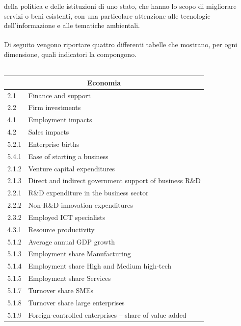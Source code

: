 \documentclass[a4paper,12pt, openright]{report}
\begin{document}
della politica e delle istituzioni di uno stato, che hanno lo scopo di migliorare servizi o beni esistenti, con una particolare attenzione  
alle tecnologie dell'informazione e alle tematiche ambientali. \\
\\
Di seguito vengono riportare quattro differenti tabelle che mostrano, per ogni dimensione, quali indicatori la compongono. \\
\\
\begin{table}[h!]
    \centering
    \begin{tabular}{ |l|l| }
        \hline
        \multicolumn{2}{|c|}{\textbf{Economia}} \\
        \hline
        2.1 & Finance and support\\
        \hline
        2.2 & Firm investments \\
        \hline
        4.1 & Employment impacts \\
        \hline
        4.2 & Sales impacts \\
        \hline
        5.2.1 & Enterprise births \\
        \hline
        5.4.1 & Ease of starting a business \\
        \hline
        2.1.2 & Venture capital expenditures \\
        \hline
        2.1.3 & Direct and indirect government support of business R\&D \\
        \hline
        2.2.1 & R\&D expenditure in the business sector \\
        \hline
        2.2.2 & Non-R\&D innovation expenditures\\
        \hline
        2.3.2 & Employed ICT specialists \\
        \hline
        4.3.1 & Resource productivity \\
        \hline
        5.1.2 & Average annual GDP growth \\
        \hline
        5.1.3 & Employment share Manufacturing \\
        \hline
        5.1.4 & Employment share High and Medium high-tech \\
        \hline
        5.1.5 & Employment share Services  \\
        \hline
        5.1.7 & Turnover share SMEs  \\
        \hline
        5.1.8 & Turnover share large enterprises  \\
        \hline
        5.1.9 & Foreign-controlled enterprises – share of value added \\

\end{tabular}
\end{table}
\end{document}

